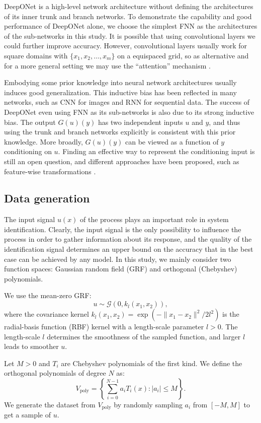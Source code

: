 \documentclass[11pt]{article}
\begin{document}
DeepONet is a high-level network architecture without defining the architectures of its inner trunk and branch networks. To demonstrate the capability and good performance of DeepONet alone, we choose the simplest FNN as the architectures of the sub-networks in this study. It is possible that using convolutional layers we could further improve accuracy. However, convolutional layers usually work for square domains with $\{x_1, x_2, \dots, x_m\}$ on a equispaced grid, so as alternative and for a more general setting we may use the ``attention'' mechanism \cite{vaswani2017attention}.

Embodying some prior knowledge into neural network architectures usually induces good generalization. This inductive bias has been reflected in many networks, such as CNN for images and RNN for sequential data. The success of DeepONet even using FNN as its sub-networks is also due to its strong inductive bias. The output $G(u)(y)$ has two independent inputs $u$ and $y$, and thus using the trunk and branch networks explicitly is consistent with this prior knowledge. More broadly, $G(u)(y)$ can be viewed as a function of $y$ conditioning on $u$. Finding an effective way to represent the conditioning input is still an open question, and different approaches have been proposed, such as feature-wise transformations \cite{dumoulin2018feature-wise}.

\subsection{Data generation}

The input signal $u(x)$ of the process plays an important role in system identification. Clearly, the input signal is the only possibility to influence the process in order to gather information about its response, and the quality of the identification signal determines an upper bound on the accuracy that in the best case can be achieved by any model. In this study, we mainly consider two function spaces: Gaussian random field (GRF) and orthogonal (Chebyshev) polynomials.

We use the mean-zero GRF:
$$u \sim \mathcal{G}(0, k_l(x_1, x_2)),$$
where the covariance kernel $k_l(x_1, x_2) = \exp(-\| x_1 -x_2 \|^2 / 2l^2)$ is the radial-basis function (RBF) kernel with a length-scale parameter $l > 0$. The length-scale $l$ determines the smoothness of the sampled function, and larger $l$ leads to smoother $u$.

Let $M>0$ and $T_i$ are Chebyshev polynomials of the first kind. We define the orthogonal polynomials of degree $N$ as: $$V_{\text{poly}}=\left\{ \sum_{i=0}^{N-1} a_i T_i(x): |a_i| \leq M \right\}.$$
We generate the dataset from $V_{\text{poly}}$ by randomly sampling $a_i$ from $[-M,M]$ to get a sample of $u$.
\end{document}
